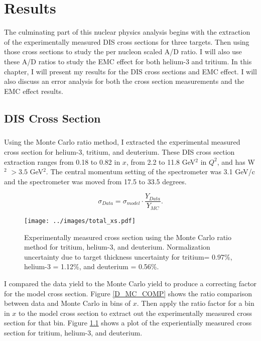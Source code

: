 
\chapter{Results}
The culminating part of this nuclear physics analysis begins with the extraction of the experimentally measured DIS cross sections for three targets. Then using those cross sections to study the per nucleon scaled A/D ratio. I will also use these A/D ratios to study the EMC effect for both helium-3 and tritium. In this chapter, I will present my results for the DIS cross sections and EMC effect. I will also discuss an error analysis for both the cross section measurements and the EMC effect results. 
\section{DIS Cross Section}
\paragraph{}Using the Monte Carlo ratio method, I extracted the experimental measured cross section for helium-3, tritium, and deuterium. These DIS cross section extraction ranges from 0.18 to 0.82 in $x$, from 2.2 to 11.8 GeV$^2$ in $Q^2$, and has W$^2$ $>3.5$ GeV$^2$. The central momentum setting of the spectrometer was 3.1 GeV/c and the spectrometer was moved from 17.5 to 33.5 degrees.

\begin{equation}
\sigma_{Data} = \sigma_{model} \cdot \frac{Y_{Data}}{Y_{MC}}. \nonumber
\end{equation}
\begin{figure}
	\texttt{[image: ../images/total\_xs.pdf]}
	\caption{Experimentally measured cross section using the Monte Carlo ratio method for tritium, helium-3, and deuterium. Normalization uncertainty due to target thickness uncertainty for tritium= 0.97\%, helium-3 = 1.12\%, and deuterium = 0.56\%.}
    \label{CCplot}
\end{figure}
I compared the data yield to the Monte Carlo yield to produce a correcting factor for the model cross section. Figure \ref{D_MC_COMP} shows the ratio comparison between data and Monte Carlo in bins of $x$. Then apply the ratio factor for a bin in $x$ to the model cross section to extract out the experimentally measured cross section for that bin. Figure \ref{CCplot} shows a plot of the experientially measured cross section for tritium, helium-3, and deuterium. 


